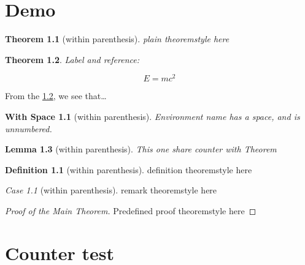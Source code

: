 \theoremstyle{plain}
\newtheorem{Theorem}{Theorem}[section]
\newtheorem{Lemma}[Theorem]{Lemma}
\newtheorem{Corollary}[Theorem]{Corollary}
\newtheorem*{With Space}{With Space}
\newtheorem{Proposition}{Proposition}[section]
\newtheorem{Conjecture}[Proposition]{Conjecture}
\newtheorem{WithoutSpace}{WithoutSpace}[section]
\theoremstyle{definition}
\newtheorem{Definition}{Definition}[section]
\theoremstyle{remark}
\newtheorem{Case}{Case}[section]

\hypertarget{demo}{%
\chapter{Demo}\label{demo}}

\begin{Theorem}[within parenthesis]
plain theoremstyle here
\end{Theorem}

\begin{Theorem}\label{simplestEquation}
\leavevmode{}%
Label and reference:

\[E=mc^2\]
\end{Theorem}

From the \ref{simplestEquation}, we see that\ldots{}

\begin{With Space}[within parenthesis]
Environment name has a space, and is unnumbered.
\end{With Space}

\begin{Lemma}[within parenthesis]
This one share counter with Theorem
\end{Lemma}

\begin{Definition}[within parenthesis]
definition theoremstyle here
\end{Definition}

\begin{Case}[within parenthesis]
remark theoremstyle here
\end{Case}

\begin{proof}[Proof of the Main Theorem]
Predefined proof theoremstyle here
\end{proof}

\hypertarget{counter-test}{%
\chapter{Counter test}\label{counter-test}}

